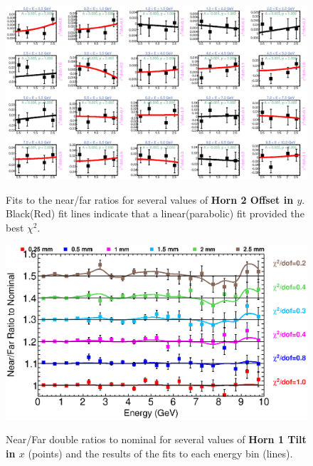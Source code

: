 {\begin{figure}[ht]
  \begin{center}
    {\includegraphics[width=5.0in]{figures/Horn2YOffset_nof_fits.eps}}
  \end{center}
\caption{ Fits to the near/far ratios for several values of {\bf Horn 2 Offset in $y$}. Black(Red) fit lines indicate that a linear(parabolic) fit provided the best $\chi^2$. }
\end{figure}

\begin{figure}[ht]
  \begin{center}
    {\includegraphics[width=6.0in]{figures/Horn1XTilt_nof_summary.eps}}
  \end{center}
\caption{ Near/Far double ratios to nominal for several values of {\bf Horn 1 Tilt in $x$} (points) and the results of the fits to each energy bin (lines).}
\end{figure}

}
